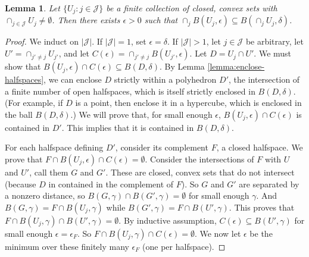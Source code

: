 \documentclass[11pt]{article}
\newtheorem{lemma}{Lemma}
\begin{document}
\begin{lemma} \label{lemma:thick-nonempty}
  Let $\{U_j : j \in \mathcal{J}\}$ be a finite collection of closed, convex sets with $\cap_{j\in\mathcal{J}} U_j \neq \emptyset$.
  Then there exists  $\epsilon > 0$ such that $\cap_j B(U_j,\epsilon) \subseteq B(\cap_j U_j, \delta)$.
\end{lemma}
\begin{proof}
  We induct on $|\mathcal{J}|$.
  If $|\mathcal{J}|=1$, set $\epsilon = \delta$.
  If $|\mathcal{J}|>1$, let $j\in\mathcal{J}$ be arbitrary, let $U' = \cap_{j'\neq j} U_{j'}$, and let $C(\epsilon) = \cap_{j' \neq j} B(U_{j'},\epsilon)$.
  Let $D = U_j \cap U'$.
  We must show that $B(U_j,\epsilon) \cap C(\epsilon) \subseteq B(D,\delta)$.
  By Lemma \ref{lemma:enclose-halfspaces}, we can enclose $D$ strictly within a polyhedron $D'$, the intersection of a finite number of open halfspaces, which is itself strictly enclosed in $B(D,\delta)$.
  (For example, if $D$ is a point, then enclose it in a hypercube, which is enclosed in the ball $B(D,\delta)$.)
  We will prove that, for small enough $\epsilon$, $B(U_j,\epsilon) \cap C(\epsilon)$ is contained in $D'$.
  This implies that it is contained in $B(D,\delta)$.

  For each halfspace defining $D'$, consider its complement $F$, a closed halfspace.
  We prove that $F \cap B(U_j,\epsilon) \cap C(\epsilon) = \emptyset$.
  Consider the intersections of $F$ with $U$ and $U'$, call them $G$ and $G'$.
  These are closed, convex sets that do not intersect (because $D$ in contained in the complement of $F$).
  So $G$ and $G'$ are separated by a nonzero distance, so $B(G,\gamma) \cap B(G',\gamma) = \emptyset$ for small enough $\gamma$.
  And $B(G,\gamma) = F \cap B(U_j,\gamma)$ while $B(G',\gamma) = F \cap B(U',\gamma)$.
  This proves that $F \cap B(U_j,\gamma) \cap B(U',\gamma) = \emptyset$.
  By inductive assumption, $C(\epsilon) \subseteq B(U',\gamma)$ for small enough $\epsilon = \epsilon_F$.
  So $F \cap B(U_j,\gamma) \cap C(\epsilon) = \emptyset$.
  We now let $\epsilon$ be the minimum over these finitely many $\epsilon_F$ (one per halfspace).
\end{proof}
\end{document}

